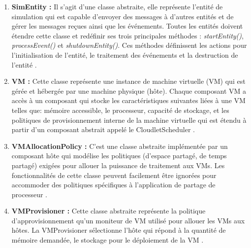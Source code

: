 \begin{onehalfspace}
\begin{enumerate} [label=\Alph*.      ]
\item \textbf{SimEntity :} Il s'agit d'une classe abstraite, elle représente l’entité de simulation qui est capable d'envoyer des messages à d'autres entités et de gérer les messages reçues ainsi que les événements. Toutes les entités doivent étendre cette classe et redéfinir ses trois principales méthodes : \textit{startEntity()}, \textit{processEvent()} et \textit{shutdownEntity()}. Ces méthodes définissent les actions pour l'initialisation de l’entité, le traitement des événements et la destruction de l’entité \cite{ref45}.
\item \textbf{VM :} Cette classe représente une instance de machine virtuelle (VM) qui est gérée et hébergée par une machine physique (hôte). Chaque composant VM a accès à un composant qui stocke les caractéristiques suivantes liées à une VM telles que: mémoire accessible, le processeur, capacité de stockage, et les politiques de provisionnement interne de la machine virtuelle qui est étendu à partir d'un composant abstrait appelé le CloudletScheduler \cite{ref45}.
\item \textbf{VMAllocationPolicy :} C'est une classe abstraite implémentée par un composant hôte qui modélise les politiques (d'espace partagé, de temps partagé) exigées pour allouer la puissance de traitement aux VMs. Les fonctionnalités de cette classe peuvent facilement être ignorées pour accommoder des politiques spécifiques à l'application de partage de processeur \cite{ref45}.
\item \textbf{VMProvisioner :} Cette classe abstraite représente la politique d'approvisionnement qu'un moniteur de VM utilisé pour allouer les VMs aux hôtes. La VMProvisioner sélectionne l’hôte qui répond à la quantité de mémoire demandée, le stockage pour le déploiement de la VM \cite{ref45}.
\end{enumerate} 
\end{onehalfspace}


